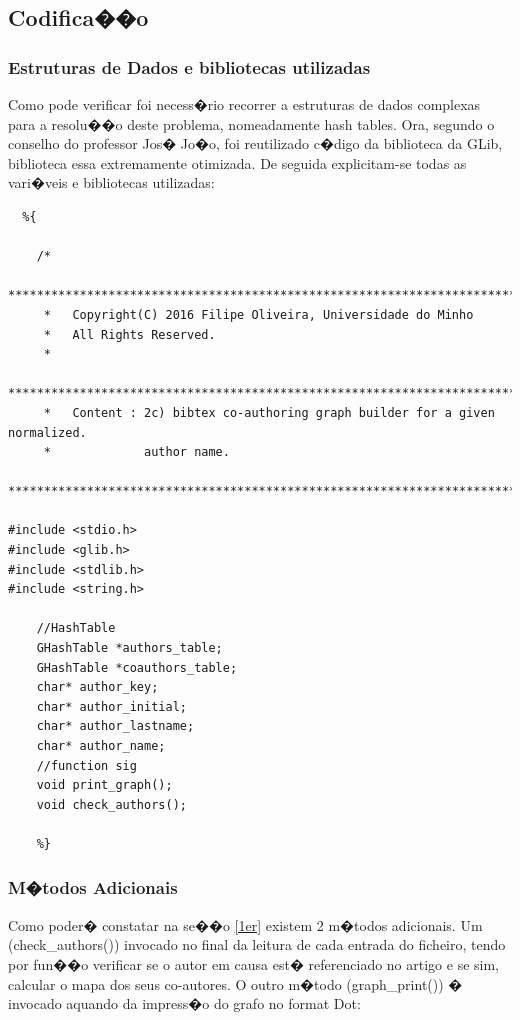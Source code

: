 \documentclass{report}
\begin{document}
  \subsection{Codifica��o }
  \subsubsection{Estruturas de Dados e bibliotecas utilizadas}
  Como pode verificar foi necess�rio recorrer a  estruturas de dados complexas para a resolu��o deste problema, nomeadamente hash tables. Ora, segundo o conselho do professor Jos� Jo�o, foi reutilizado c�digo da biblioteca da GLib, biblioteca essa extremamente otimizada.
    De seguida explicitam-se todas as vari�veis e bibliotecas utilizadas:
    \begin{lstlisting}
  %{

    /*
     ********************************************************************************
     *   Copyright(C) 2016 Filipe Oliveira, Universidade do Minho
     *   All Rights Reserved.
     *
     ********************************************************************************
     *   Content : 2c) bibtex co-authoring graph builder for a given normalized.
     *             author name.
     ********************************************************************************/

#include <stdio.h>
#include <glib.h>
#include <stdlib.h>
#include <string.h>

    //HashTable
    GHashTable *authors_table; 
    GHashTable *coauthors_table; 
    char* author_key;
    char* author_initial;
    char* author_lastname;
    char* author_name; 
    //function sig
    void print_graph();
    void check_authors();

    %}
    \end{lstlisting}

    \subsubsection{M�todos Adicionais}
    Como poder� constatar na se��o \ref{1er} existem 2 m�todos adicionais. Um (check\_authors()) invocado no final da leitura de cada entrada do ficheiro, tendo por fun��o verificar se o autor em causa est� referenciado no artigo e se sim, calcular o mapa dos seus co-autores. O outro m�todo (graph\_print()) � invocado aquando da impress�o do grafo no format Dot:
\end{document}
